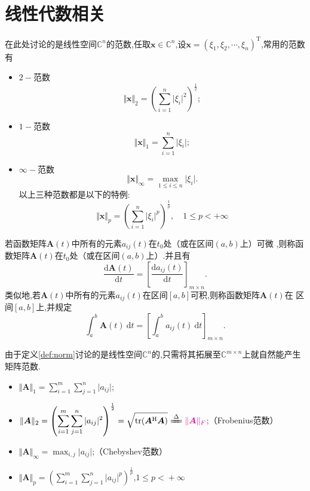 \documentclass[cn,10pt,citestyle=gb7714-2015,bibstyle=gb7714-2015]{elegantbook}
\newcommand{\md}{\ \mathrm{d}}
\newcommand{\mT}{\mathrm{T}}
\newcommand{\tr}{\textup{tr}}
\begin{document}
\section{线性代数相关}
\begin{definition}[范数]\label{def:norm}
  在此处讨论的是线性空间$\mathbb{C}^n$的范数,任取$\bm{x}\in\mathbb{C}^n$,设$\bm{x}=(\xi_1,\xi_2,\cdots,\xi_n)^\mT$,常用的范数有
  \begin{itemize}
    \item $2-$范数
    \[
      \Vert\bm{x}\Vert_2=\left(\sum_{i=1}^n\vert\xi_i\vert^2\right)^{\frac12};
    \]
    \item $1-$范数
    \[
      \Vert\bm{x}\Vert_1=\sum_{i=1}^n\vert\xi_i\vert;
    \]
    \item $\infty-$范数
    \[
      \Vert\bm{x}\Vert_\infty=\max_{1\leqslant i\leqslant n}\vert\xi_i\vert.
    \]
    以上三种范数都是以下的特例:
    \begin{equation}
      \Vert\bm{x}\Vert_p=\left(\sum_{i=1}^n\vert\xi_i\vert^p\right)^{\frac 1p},\quad 1\leqslant p< +\infty
    \end{equation}
  \end{itemize}
\end{definition}
\begin{definition}[函数矩阵的微分和积分]\label{def:Matrix-Differential-and-Integrate}
  若函数矩阵$\bm{A}(t)$中所有的元素$a_{ij}(t)$在$t_0$处（或在区间$(a,b)$上）可微
  ,则称函数矩阵$\bm{A}(t)$在$t_0$处（或在区间$(a,b)$上）.并且有
  \begin{equation}
    \frac{\mathrm{d}\bm{A}(t)}{\mathrm{d}t}=\left[\frac{\mathrm{d}a_{ij}(t)}{\mathrm{d}t}\right]_{m\times n}.
  \end{equation}
  类似地,若$\bm{A}(t)$中所有的元素$a_{ij}(t)$在区间$[a,b]$可积,则称函数矩阵$\bm{A}(t)$在
  区间$[a,b]$上,并规定
  \begin{equation}
    \int_{a}^b\bm{A}(t)\md t=\left[\int_a^ba_{ij}(t)\md t\right]_{m\times n}.
  \end{equation}
\end{definition}
\begin{definition}[矩阵范数]\label{def:matrix-norm}
  由于定义\ref{def:norm}讨论的是线性空间$\mathbb{C}^n$的,只需将其拓展至$\mathbb{C}^{m\times n}$上就自然能产生矩阵范数.
  \begin{itemize}
    \item $\displaystyle \Vert\bm{A}\Vert_1=\sum_{i=1}^m\sum_{j=1}^n\vert a_{ij}\vert$;
    \item $\displaystyle \Vert\bm{A}\Vert_2=\left(\sum_{i=1}^m\sum_{j=1}^n\vert a_{ij}\vert^2\right)^{\frac12}=\sqrt{\tr(\bm{A}^{\textup{H}}\bm{A})}\xlongequal{\Delta}\textcolor{magenta}{\Vert\bm{A}\Vert_F}$;\qquad（Frobenius范数）
    \item $\displaystyle \Vert\bm{A}\Vert_\infty=\max_{i,j}\vert a_{ij}\vert$;\qquad（Chebyshev范数）
    \item $\displaystyle \Vert\bm{A}\Vert_p=\left(\sum_{i=1}^m\sum_{j=1}^n\vert a_{ij}\vert^p\right)^{\frac1p}$,\quad$1\leqslant p<{}+\infty$
  \end{itemize}
\end{definition}
\end{document}

